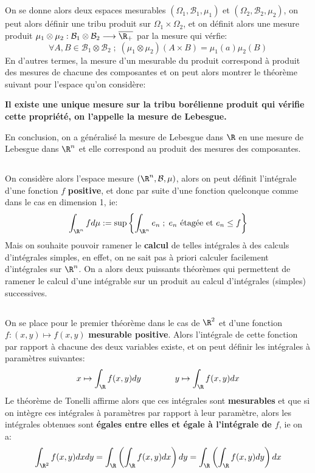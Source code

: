 \subsection*{}
On se donne alors deux espaces mesurables \( ( \Omega_1, \mathcal{B}_1, \mu_1) \) et \( ( \Omega_2, \mathcal{B}_2, \mu_2) \), on peut alors définir une tribu produit sur \( \Omega_1 \times \Omega_2 \), et on définit alors une mesure produit \( \mu_1 \otimes \mu_2 : \mathcal{B}_1 \otimes \mathcal{B}_2 \longrightarrow \overline{\R_+} \) par la mesure qui vérfie:
\[ 
   \forall A, B \in \mathcal{B}_1 \otimes \mathcal{B}_2 \; ; \; (\mu_1 \otimes \mu_2)(A \times B) = \mu_1(a)\mu_2(B)
\]
En d'autres termes, la mesure d'un mesurable du produit correspond à produit des mesures de chacune des composantes et on peut alors montrer le théorème suivant pour l'espace qu'on considère:
\begin{center}
   \textbf{Il existe une unique mesure sur la tribu borélienne produit qui vérifie cette propriété, on l'appelle la mesure de Lebesgue.}
\end{center}
En conclusion, on a généralisé la mesure de Lebesgue dans \( \R \) en une mesure de Lebesgue dans \( \R^n \) et elle correspond au produit des mesures des composantes.

\subsection*{}
On considère alors l'espace mesure \((\R^n, \mathcal{B}, \mu)\), alors on peut définit l'intégrale d'une fonction \( f \) \textbf{positive}, et donc par suite d'une fonction quelconque comme dans le cas en dimension 1, ie:
\[ 
   \int_{ \R^n} f d\mu := \sup \left\{ \int_{ \R^n} e_n \; ; \; e_n \text{ étagée et } e_n \leq f\right\} 
\]
Mais on souhaite pouvoir ramener le \textbf{calcul} de telles intégrales à des calculs d'intégrales simples, en effet, on ne sait pas à priori calculer facilement d'intégrales sur \(\R^n\). On a alors deux puissants théorèmes qui permettent de ramener le calcul d'une intégrable sur un produit au calcul d'intégrales (simples) successives.
\pagebreak

\subsection*{}
On se place pour le premier théorème dans le cas de \( \R^2 \) et d'une fonction \( f : (x, y) \mapsto f(x, y) \) \textbf{mesurable positive}.
Alors l'intégrale de cette fonction par rapport à chacune des deux variables existe, et on peut définir les intégrales à paramètres suivantes:
\[ 
   x \mapsto \int_\R f(x, y)dy \quad\quad\quad\quad y \mapsto \int_\R f(x, y)dx
\]
Le théorème de Tonelli affirme alors que ces intégrales sont \textbf{mesurables} et que si on intègre ces intégrales à paramètres par rapport à leur paramètre, alors les intégrales obtenues sont \textbf{égales entre elles et égale à l'intégrale de \( f \)}, ie on a:
\[ 
   \int_{\R^2} f(x, y) dxdy = \int_\R \left( \int_\R f(x, y)dx  \right)dy = \int_\R \left( \int_\R f(x, y)dy  \right)dx
\]

